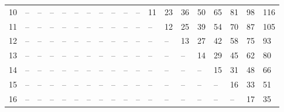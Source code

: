 \begin{tcolorbox}[breakable,boxrule=0pt]
\begin{tabular}{@{}l l l l l l l l l l l l l l l l l l l}
10 & -- & -- & -- & -- & -- & -- & -- & -- & -- & -- & 11 & 23 & 36 & 50 & 65 & 81 & 98 & 116\\
11 & -- & -- & -- & -- & -- & -- & -- & -- & -- & -- & -- & 12 & 25 & 39 & 54 & 70 & 87 & 105\\
12 & -- & -- & -- & -- & -- & -- & -- & -- & -- & -- & -- & -- & 13 & 27 & 42 & 58 & 75 & 93\\
13 & -- & -- & -- & -- & -- & -- & -- & -- & -- & -- & -- & -- & -- & 14 & 29 & 45 & 62 & 80\\
14 & -- & -- & -- & -- & -- & -- & -- & -- & -- & -- & -- & -- & -- & -- & 15 & 31 & 48 & 66\\
15 & -- & -- & -- & -- & -- & -- & -- & -- & -- & -- & -- & -- & -- & -- & -- & 16 & 33 & 51\\
16 & -- & -- & -- & -- & -- & -- & -- & -- & -- & -- & -- & -- & -- & -- & -- & -- & 17 & 35\\
\end{tabular}
\end{tcolorbox}
